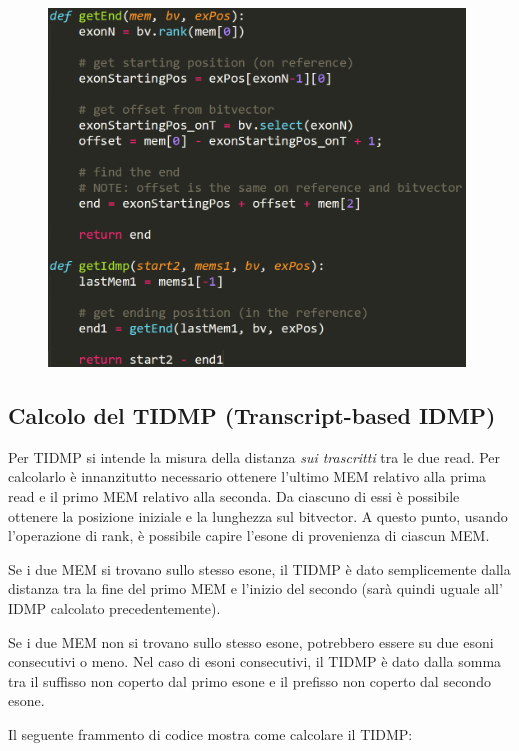 \begin{figure}[h!]
	\centering
	\includegraphics[width=\linewidth, height=9.5cm]{images/getIDMP.png}
  \label{fig:GetIDMP}
\end{figure}

\newpage

\subsection{Calcolo del TIDMP (Transcript-based IDMP)}
Per TIDMP si intende la misura della distanza \textit{sui trascritti} tra le due read. Per calcolarlo è innanzitutto necessario ottenere l'ultimo MEM relativo alla prima read e il primo MEM relativo alla seconda. Da ciascuno di essi è possibile ottenere la posizione iniziale e la lunghezza sul bitvector. A questo punto, usando l'operazione di rank, è possibile capire l'esone di provenienza di ciascun MEM.

Se i due MEM si trovano sullo stesso esone, il TIDMP è dato semplicemente dalla distanza tra la fine del primo MEM e l'inizio del secondo (sarà quindi uguale all' IDMP calcolato precedentemente).

Se i due MEM non si trovano sullo stesso esone, potrebbero essere su due esoni consecutivi o meno. Nel caso di esoni consecutivi, il TIDMP è dato dalla somma tra il suffisso non coperto dal primo esone e il prefisso non coperto dal secondo esone.

Il seguente frammento di codice mostra come calcolare il TIDMP:

